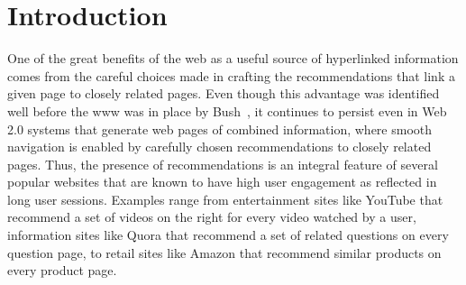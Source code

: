 \begin{abstract}
\iffalse
In this paper, we study the problem of graph recommendations as
variants of bipartite matching problems. We consider the problem
of solving such matching problems in practice at web-scale. To achieve
this we introduce several models to simulate underlying input graph
structures. We then analyze the conditions under which a random sample
of edges using constant memory already suffices to be a
'good' recommendation algorithm as opposed the cases when we may consider
the more classical and involved linear memory polynomial time algorithms.
We also show how to select the number of recommendations per item while
building a website so that there exists a 'perfect' graph recommendation.
\fi

\end{abstract}

\section{Introduction}

One of the great benefits of the web as a useful source of hyperlinked
information comes from the careful choices made in crafting the recommendations
that link a given page to closely related pages. Even though this advantage was
identified well before the www was in place by Bush~\cite{Bush45}, it continues
to persist even in Web 2.0 systems that generate web pages of combined
information, where smooth navigation is enabled by carefully chosen
recommendations to closely related pages. Thus, the presence of recommendations
is an integral feature of several popular websites that are known to have high
user engagement as reflected in long user sessions. Examples range from 
entertainment sites like YouTube that recommend a set of videos on the right
for every video watched by a user, information sites like Quora that recommend
a set of related questions on every question page, to retail sites like Amazon
that recommend similar products on every product page. \vs


